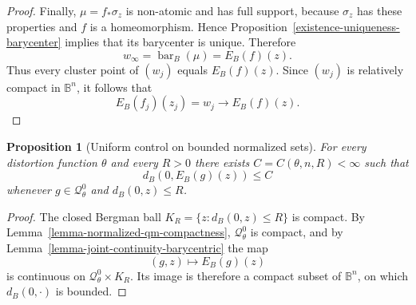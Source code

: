 \documentclass[11pt]{article}
\newtheorem{proposition}[theorem]{Proposition}
\theoremstyle{definition}
\theoremstyle{remark}
\theoremstyle{definition}
\newcommand{\B}{\mathbb B}
\newcommand{\barB}{\operatorname{bar}_{B}}
\begin{document}
\begin{proof}
Finally, \(\mu=f_*\sigma_z\) is non-atomic and has full support, because
\(\sigma_z\) has these properties and \(f\) is a homeomorphism. Hence
Proposition~\ref{existence-uniqueness-barycenter} implies that its
barycenter is unique. Therefore
\[
        w_\infty=\barB(\mu)=E_B(f)(z).
\]
Thus every cluster point of \((w_j)\) equals \(E_B(f)(z)\). Since
\((w_j)\) is relatively compact in \(\B^n\), it follows that
\[
        E_B(f_j)(z_j)=w_j\longrightarrow E_B(f)(z).
\]
\end{proof}


\begin{proposition}[Uniform control on bounded normalized sets]
\label{proposition-uniform-bounded-displacement}
For every distortion function \(\theta\) and every \(R>0\) there exists
\(C=C(\theta,n,R)<\infty\) such that
\[
        d_B(0,E_B(g)(z))\le C
\]
whenever \(g\in\mathcal Q_\theta^0\) and \(d_B(0,z)\le R\).
\end{proposition}

\begin{proof}
The closed Bergman ball \(K_R=\{z:d_B(0,z)\le R\}\) is compact.  By
Lemma~\ref{lemma-normalized-qm-compactness}, \(\mathcal Q_\theta^0\) is compact,
and by Lemma~\ref{lemma-joint-continuity-barycentric} the map
\[
        (g,z)\longmapsto E_B(g)(z)
\]
is continuous on \(\mathcal Q_\theta^0\times K_R\).  Its image is therefore a
compact subset of \(\B^n\), on which \(d_B(0,\cdot)\) is bounded.
\end{proof}
\end{document}
